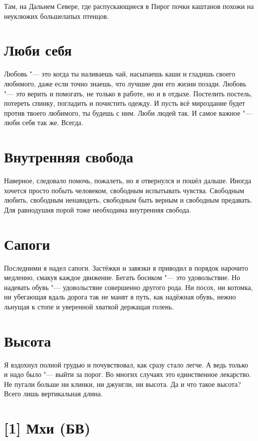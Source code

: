 Там, на Дальнем Севере, где распускающиеся в Пирог почки каштанов похожи на неуклюжих большелапых птенцов.

\section{Люби себя}

Любовь "--- это когда ты наливаешь чай, насыпаешь каши и гладишь своего любимого, даже если точно знаешь, что лучшие дни его жизни позади.
Любовь "--- это верить и помогать, не только в работе, но и в отдыхе.
Постелить постель, потереть спинку, погладить и почистить одежду.
И пусть всё мироздание будет против твоего любимого, ты будешь с ним.
Люби людей так.
И самое важное "--- люби себя так же.
Всегда.

\section{Внутренняя свобода}

Наверное, следовало помочь, пожалеть, но я отвернулся и пошёл дальше.
Иногда хочется просто побыть человеком, свободным испытывать чувства.
Свободным любить, свободным ненавидеть, свободным быть верным и свободным предавать.
Для равнодушия порой тоже необходима внутренняя свобода.

\section{Сапоги}

Последними я надел сапоги.
Застёжки и завязки я приводил в порядок нарочито медленно, смакуя каждое движение.
Бегать босиком "--- это удовольствие.
Но надевать обувь "--- удовольствие совершенно другого рода.
Ни посох, ни котомка, ни убегающая вдаль дорога так не манят в путь, как надёжная обувь, нежно льнущая к стопе и уверенной хваткой держащая голень.

\section{Высота}

Я вздохнул полной грудью и почувствовал, как сразу стало легче.
А ведь только и надо было "--- выйти за порог.
Во многих случаях это единственное лекарство.
Не пугали больше ни клинки, ни джунгли, ни высота.
Да и что такое высота?
Всего лишь вертикальная длина.

\section{[1] Мхи (БВ)}

